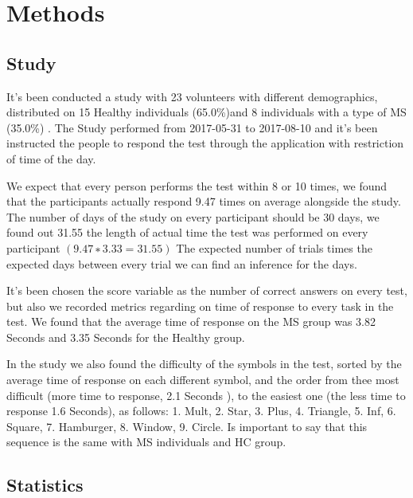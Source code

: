 \documentclass[letterpaper, 10 pt, conference]{ieeeconf}
\begin{document}
\section{Methods}
\vspace{2mm}

\subsection{Study}
\vspace{2mm}

It's been conducted a study with 23 volunteers with different demographics, distributed on 15 Healthy individuals (65.0\%)and 8 individuals with a type of MS (35.0\%) . The Study performed from 2017-05-31 to 2017-08-10 and it's been instructed the people to respond the test through the application with restriction of time of the day.

We expect that every person performs the test within 8 or 10 times, we found that the participants actually respond 9.47 times on average alongside the study. The number of days of the study on every participant should be 30 days, we found out 31.55 the length of actual time the test was performed on every participant $(9.47∗3.33=31.55)$ The expected number of trials times the expected days between every trial we can find an inference for the days.

It's been chosen the score variable as the number of correct answers on every test, but also we recorded metrics regarding on time of response to every task in the test. We found that the average time of response on the MS group was 3.82 Seconds and 3.35 Seconds for the Healthy group.

In the study we also found the difficulty of the symbols in the test, sorted by the average time of response on each different symbol, and the order from thee most difficult (more time to response, 2.1 Seconds ), to the easiest one (the less time to response 1.6 Seconds), as follows: 1. Mult, 2. Star, 3. Plus, 4. Triangle, 5. Inf, 6. Square, 7. Hamburger, 8. Window, 9. Circle. Is important to say that this sequence is the same with MS individuals and HC group.

\subsection{Statistics}
\vspace{2mm}
\end{document}
